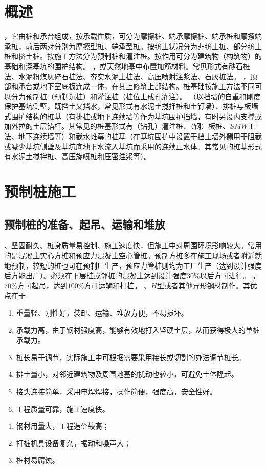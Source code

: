 \documentclass{book}
\begin{document}
\section{概述}
，它由桩和承台组成，按承载性质，可分为摩擦桩、端承摩擦桩、端承桩和摩擦端承桩，前后两对分别为摩擦型桩、端承型桩。按挤土状况分为非挤土桩、部分挤土桩和挤土桩。按施工方法分为预制桩和灌注桩。按作用可分为建筑物（构筑物）的基础和深基坑的围护结构。
，或天然地基中布置加筋材料。常见形式有砂石桩法、水泥粉煤灰碎石桩法、夯实水泥土桩法、高压喷射注浆法、石灰桩法。
，顶部和承台或地下室底板连成一体，在其上修筑上部结构。桩基础按施工方法不同可以分为预制桩（预制沉桩）和灌注桩（桩位上成孔灌注）。
（以挡墙的自重和刚度保护基坑侧壁，既挡土又挡水，常见形式有水泥土搅拌桩和土钉墙）、排桩与板墙式围护结构的桩基（有排桩或地下连续墙等作为基坑围护挡墙，有时另设内支撑或加外拉的土层锚杆。其常见的桩基形式有（钻孔）灌注桩、（钢）板桩、$SMW$工法、地下连续墙等）和截水帷幕的桩基（在基坑围护中设置于挡土墙外侧用于阻截或减少基坑侧壁及基坑底地下水流入基坑而采用的连续止水体。其常见的桩基形式有水泥土搅拌桩、高压旋喷桩和压密注浆等）。
\section{预制桩施工}
\subsection{预制桩的准备、起吊、运输和堆放}
、坚固耐久、桩身质量易控制、施工速度快，但施工中对周围环境影响较大。常用的是混凝土实心方桩和预应力混凝土空心管桩。预制方桩多在施工现场或者附近就地预制，较短的桩也可在预制厂生产，预应力管桩则均为工厂生产（达到设计强度后方能出厂）。必须在下层桩或邻桩的混凝土达到设计强度$30\%$以后方可进行。
。
$70\%$方可起吊，达到$100\%$方可运输和打桩。
、$H$型或者其他异形钢材制作。其优点在于
\begin{enumerate}
    \item 重量轻、刚性好，装卸、运输、堆放方便，不易损坏。
    \item 承载力高，由于钢材强度高，能够有效地打入坚硬土层，从而获得极大的单桩承载力。
    \item 桩长易于调节，实际施工中可根据需要采用接长或切割的办法调节桩长。
    \item 排土量小，对邻近建筑物及周围地基的扰动也较小，可避免土体隆起。
    \item 接头连接简单，采用电焊焊接，操作简便，强度高，安全性好。
    \item 工程质量可靠，施工速度快。
\end{enumerate}
\begin{enumerate}
    \item 钢材用量大，工程造价较高；
    \item 打桩机具设备复杂，振动和噪声大；
    \item 桩材易腐蚀。
\end{enumerate}
\end{document}
